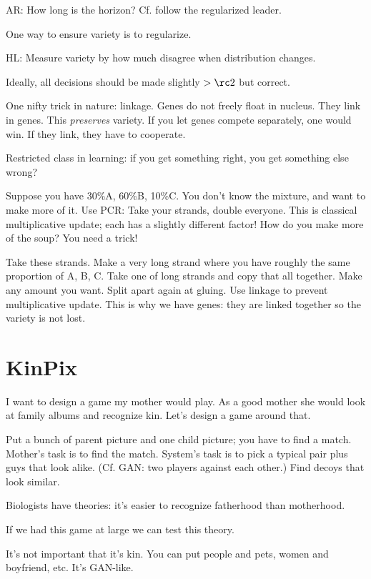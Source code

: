 AR: How long is the horizon? Cf. follow the regularized leader.

One way to ensure variety is to regularize. 

HL: Measure variety by how much disagree when distribution changes.

Ideally, all decisions should be made slightly $>\rc2$ but correct.

One nifty trick in nature: linkage. Genes do not freely float in nucleus. They link in genes. This \emph{preserves} variety. If you let genes compete separately, one would win. If they link, they have to cooperate.

Restricted class in learning: if you get something right, you get something else wrong?

Suppose you have 30\%A, 60\%B, 10\%C. You don't know the mixture, and want to make more of it. Use PCR: Take your strands, double everyone. This is classical multiplicative update; each has a slightly different factor! How do you make more of the soup? You need a trick!

Take these strands. Make a very long strand where you have roughly the same proportion of A, B, C. Take one of long strands and copy that all together. Make any amount you want. Split apart again at gluing. Use linkage to prevent multiplicative update. This is why we have genes: they are linked together so the variety is not lost. 


\section{KinPix}

I want to design a game my mother would play. As a good mother she would look at family albums and recognize kin. Let's design a game around that.

Put a bunch of parent picture and one child picture; you have to find a match. Mother's task is to find the match. System's task is to pick a typical pair plus guys that look alike. (Cf. GAN: two players against each other.) Find decoys that look similar. 

Biologists have theories: it's easier to recognize fatherhood than motherhood. 

If we had this game at large we can test this theory.

It's not important that it's kin. You can put people and pets, women and boyfriend, etc. It's GAN-like. %

